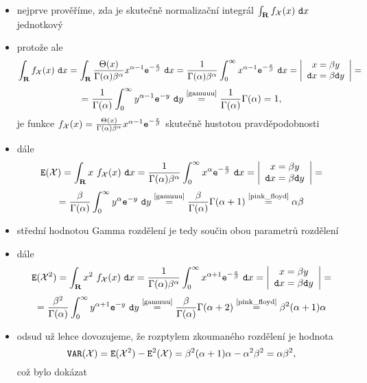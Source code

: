 \begin{itemize}
\item nejprve prov\v e\v r\'ime, zda je skute\v cn\v e normaliza\v cn\'i integr\'al $\int_{\mathbf R} f_{\mathcal X}(x)~\mathtt{d}x$ jednotkov\'y
\item proto\v ze ale $$\int_{\mathbf R} f_{\mathcal X}(x)~\mathtt{d}x=\int_{\mathbf R} \frac{\Theta(x)}{\Gamma(\alpha) \beta^{\alpha}}x^{\alpha-1}\mathtt{e}^{-\frac{x}{\beta}} ~\mathtt{d}x = \frac{1}{\Gamma(\alpha) \beta^{\alpha}} \int_0^\infty x^{\alpha-1}\mathtt{e}^{-\frac{x}{\beta}} ~\mathtt{d}x = \left|\begin{array}{c} x=\beta y\\ \mathtt{d}x=\beta \mathtt{d}y \end{array}\right|=$$
%
$$=\frac{1}{\Gamma(\alpha)} \int_0^\infty y^{\alpha-1}\mathtt{e}^{-y} ~\mathtt{d}y \stackrel{\text{\eqref{gamuuu}}}{=} \frac{1}{\Gamma(\alpha)}\Gamma(\alpha)=1,$$
%
je funkce $ f_{\mathcal X}(x) = \frac{\Theta(x)}{\Gamma(\alpha) \beta^{\alpha}}x^{\alpha-1}\mathtt{e}^{-\frac{x}{\beta}}$ skute\v cn\v e hustotou pravd\v epodobnosti
\item d\'ale
%
$$\mathtt{E}({\mathcal X}) = \int_{\mathbf R} x~f_{\mathcal X}(x)~\mathtt{d}x= \frac{1}{\Gamma(\alpha) \beta^{\alpha}} \int_0^\infty x^{\alpha}\mathtt{e}^{-\frac{x}{\beta}} ~\mathtt{d}x = \left|\begin{array}{c} x=\beta y\\ \mathtt{d}x=\beta \mathtt{d}y \end{array}\right|=$$
%
$$=\frac{\beta}{\Gamma(\alpha)} \int_0^\infty y^{\alpha}\mathtt{e}^{-y} ~\mathtt{d}y \stackrel{\text{\eqref{gamuuu}}}{=} \frac{\beta}{\Gamma(\alpha)}\Gamma(\alpha+1) \stackrel{\text{\eqref{pink_floyd}}}{=} \alpha \beta $$
\item st\v redn\'i hodnotou Gamma rozd\v elen\'i je tedy sou\v cin obou parametr\r u rozd\v elen\'i
\item d\'ale
%
$$\mathtt{E}({\mathcal X}^2) = \int_{\mathbf R} x^2~f_{\mathcal X}(x)~\mathtt{d}x= \frac{1}{\Gamma(\alpha) \beta^{\alpha}} \int_0^\infty x^{\alpha+1}\mathtt{e}^{-\frac{x}{\beta}} ~\mathtt{d}x = \left|\begin{array}{c} x=\beta y\\ \mathtt{d}x=\beta \mathtt{d}y \end{array}\right|=$$
%
$$=\frac{\beta^2}{\Gamma(\alpha)} \int_0^\infty y^{\alpha+1}\mathtt{e}^{-y} ~\mathtt{d}y \stackrel{\text{\eqref{gamuuu}}}{=} \frac{\beta}{\Gamma(\alpha)}\Gamma(\alpha+2) \stackrel{\text{\eqref{pink_floyd}}}{=} \beta^2 (\alpha+1)\alpha$$

\item odsud u\v z lehce dovozujeme, \v ze rozptylem zkouman\'eho rozd\v elen\'i je hodnota $$\mathtt{VAR}({\mathcal X})=\mathtt{E}({\mathcal X}^2)-\mathtt{E}^2({\mathcal X})=\beta^2 (\alpha+1)\alpha-\alpha^2\beta^2=\alpha\beta^2,$$ co\v z bylo dok\'azat

\end{itemize}


